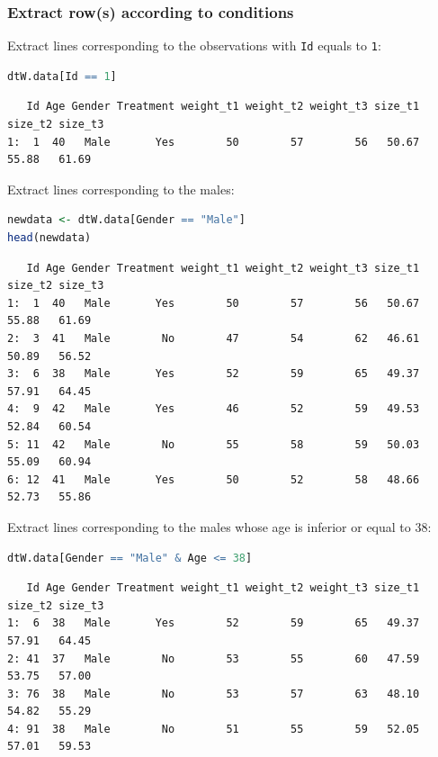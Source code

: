 \documentclass{article}
\begin{document}
\subsubsection{Extract row(s) according to conditions}
\label{sec:org896a0e8}

Extract lines corresponding to the observations with \texttt{Id} equals to \texttt{1}:
\begin{lstlisting}[language=r,numbers=none]
dtW.data[Id == 1]
\end{lstlisting}

\label{}
\begin{verbatim}
   Id Age Gender Treatment weight_t1 weight_t2 weight_t3 size_t1 size_t2 size_t3
1:  1  40   Male       Yes        50        57        56   50.67   55.88   61.69
\end{verbatim}


Extract lines corresponding to the males:
\begin{lstlisting}[language=r,numbers=none]
newdata <- dtW.data[Gender == "Male"]
head(newdata)
\end{lstlisting}

\label{}
\begin{verbatim}
   Id Age Gender Treatment weight_t1 weight_t2 weight_t3 size_t1 size_t2 size_t3
1:  1  40   Male       Yes        50        57        56   50.67   55.88   61.69
2:  3  41   Male        No        47        54        62   46.61   50.89   56.52
3:  6  38   Male       Yes        52        59        65   49.37   57.91   64.45
4:  9  42   Male       Yes        46        52        59   49.53   52.84   60.54
5: 11  42   Male        No        55        58        59   50.03   55.09   60.94
6: 12  41   Male       Yes        50        52        58   48.66   52.73   55.86
\end{verbatim}


Extract lines corresponding to the males whose age is inferior or
equal to 38:
\begin{lstlisting}[language=r,numbers=none]
dtW.data[Gender == "Male" & Age <= 38]
\end{lstlisting}

\label{}
\begin{verbatim}
   Id Age Gender Treatment weight_t1 weight_t2 weight_t3 size_t1 size_t2 size_t3
1:  6  38   Male       Yes        52        59        65   49.37   57.91   64.45
2: 41  37   Male        No        53        55        60   47.59   53.75   57.00
3: 76  38   Male        No        53        57        63   48.10   54.82   55.29
4: 91  38   Male        No        51        55        59   52.05   57.01   59.53
\end{verbatim}
\end{document}
